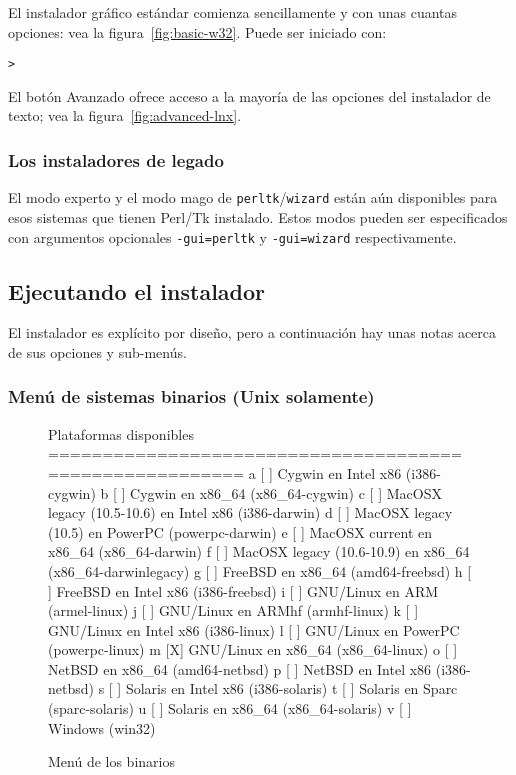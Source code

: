 \documentclass{article}
\begin{document}
El instalador gráfico estándar comienza sencillamente y con
unas cuantas opciones: vea la figura~\ref{fig:basic-w32}.
Puede ser iniciado con:
\begin{alltt}
	> 
\end{alltt}

El botón Avanzado ofrece acceso a la mayoría de las opciones
del instalador de texto;  vea la
figura~\ref{fig:advanced-lnx}.

\subsubsection{Los instaladores de legado}

El modo experto y el modo mago de
\texttt{perltk}/\texttt{wizard} están aún disponibles para
esos sistemas que tienen Perl/Tk instalado. Estos modos
pueden ser especificados con argumentos opcionales
\texttt{-gui=perltk} y \texttt{-gui=wizard} respectivamente.

\subsection{Ejecutando el instalador}
\label{sec:runinstall}

El instalador es explícito por diseño, pero a continuación hay unas
notas acerca de sus opciones y sub-menús. 

\subsubsection{Menú de sistemas binarios (Unix solamente)}
\label{sec:binary}

\begin{figure}[tb]
\begin{boxedverbatim}
Plataformas disponibles
========================================================
   a [ ] Cygwin en Intel x86 (i386-cygwin)
   b [ ] Cygwin en x86_64 (x86_64-cygwin)
   c [ ] MacOSX legacy (10.5-10.6) en Intel x86 (i386-darwin)
   d [ ] MacOSX legacy (10.5) en PowerPC (powerpc-darwin)
   e [ ] MacOSX current en x86_64 (x86_64-darwin)
   f [ ] MacOSX legacy (10.6-10.9) en x86_64 (x86_64-darwinlegacy)
   g [ ] FreeBSD en x86_64 (amd64-freebsd)
   h [ ] FreeBSD en Intel x86 (i386-freebsd)
   i [ ] GNU/Linux en ARM (armel-linux)
   j [ ] GNU/Linux en ARMhf (armhf-linux)
   k [ ] GNU/Linux en Intel x86 (i386-linux)
   l [ ] GNU/Linux en PowerPC (powerpc-linux)
   m [X] GNU/Linux en x86_64 (x86_64-linux)
   o [ ] NetBSD en x86_64 (amd64-netbsd)
   p [ ] NetBSD en Intel x86 (i386-netbsd)
   s [ ] Solaris en Intel x86 (i386-solaris)
   t [ ] Solaris en Sparc (sparc-solaris)
   u [ ] Solaris en x86_64 (x86_64-solaris)
   v [ ] Windows (win32)
\end{boxedverbatim}
\caption{Menú de los binarios}\label{fig:bin-text}
\end{figure}
\end{document}
